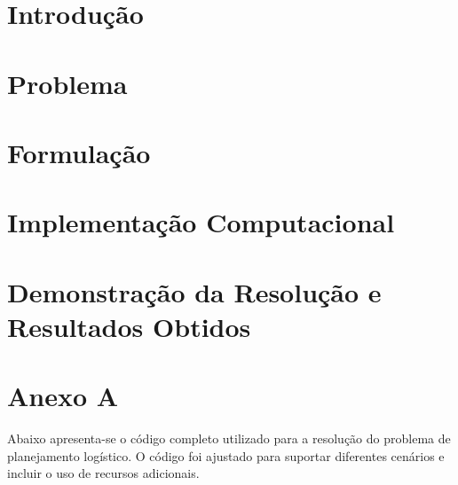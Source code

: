 \documentclass[12pt,a4paper,final]{article}
\begin{document}
    \section{Introdução}\label{sec:introducao}
    


    \section{Problema}\label{sec:problema}
    


    \section{Formulação}\label{sec:formulacao}
    


    \section{Implementação Computacional}\label{sec:implementacao-computacional}
    


    \section{Demonstração da Resolução e Resultados Obtidos}\label{sec:demonstracao-da-resolucao-e-resultados-obtidos}
    
    \newpage
    \appendix

    \section*{Anexo A}

    Abaixo apresenta-se o código completo utilizado para a resolução do problema de planejamento logístico. O código foi ajustado para suportar diferentes cenários e incluir o uso de recursos adicionais.
\end{document}
